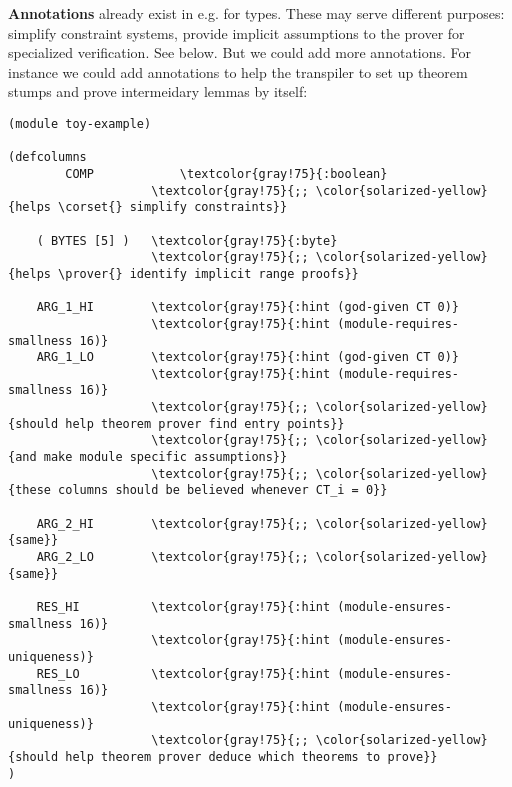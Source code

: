 \textbf{Annotations} already exist in \corset{} e.g. for types. These may serve different purposes: simplify constraint systems, provide implicit assumptions to the prover for specialized verification. See below. But we could add more annotations. For instance we could add annotations to help the transpiler to set up theorem stumps and prove intermeidary lemmas by itself:
\begin{Verbatim}[commandchars=\\\{\}]
(module toy-example)

(defcolumns
        COMP            \textcolor{gray!75}{:boolean}
	                \textcolor{gray!75}{;; \color{solarized-yellow}{helps \corset{} simplify constraints}}
			
	( BYTES [5] )   \textcolor{gray!75}{:byte}
	                \textcolor{gray!75}{;; \color{solarized-yellow}{helps \prover{} identify implicit range proofs}}

	ARG_1_HI        \textcolor{gray!75}{:hint (god-given CT 0)}
	                \textcolor{gray!75}{:hint (module-requires-smallness 16)}
	ARG_1_LO        \textcolor{gray!75}{:hint (god-given CT 0)}
	                \textcolor{gray!75}{:hint (module-requires-smallness 16)}
	                \textcolor{gray!75}{;; \color{solarized-yellow}{should help theorem prover find entry points}}
	                \textcolor{gray!75}{;; \color{solarized-yellow}{and make module specific assumptions}}
	                \textcolor{gray!75}{;; \color{solarized-yellow}{these columns should be believed whenever CT_i = 0}}

	ARG_2_HI        \textcolor{gray!75}{;; \color{solarized-yellow}{same}}
	ARG_2_LO        \textcolor{gray!75}{;; \color{solarized-yellow}{same}}

	RES_HI          \textcolor{gray!75}{:hint (module-ensures-smallness 16)}
	                \textcolor{gray!75}{:hint (module-ensures-uniqueness)}
	RES_LO          \textcolor{gray!75}{:hint (module-ensures-smallness 16)}
	                \textcolor{gray!75}{:hint (module-ensures-uniqueness)}
	                \textcolor{gray!75}{;; \color{solarized-yellow}{should help theorem prover deduce which theorems to prove}}
)
\end{Verbatim}
